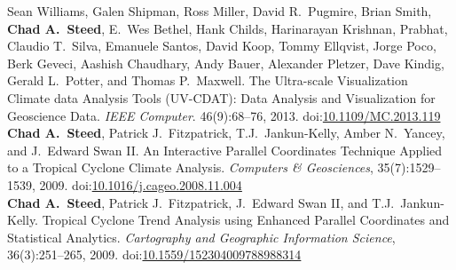 \documentclass[11pt, letterpaper]{article}
\newcommand{\amper}{{\fontspec[Scale=.95]{Hoefler Text}\selectfont\itshape\&}}
\newcommand{\years}[1]{\marginnote{\scriptsize #1}}
\begin{document}
\begin{sloppypar}
Sean Williams, Galen Shipman, Ross Miller, David R.\ Pugmire, Brian Smith,
\textbf{Chad A.\ Steed}, E.\ Wes Bethel, Hank Childs, Harinarayan Krishnan,
Prabhat, Claudio T.\ Silva, Emanuele Santos, David Koop, Tommy Ellqvist,
Jorge Poco, Berk Geveci, Aashish Chaudhary, Andy Bauer, Alexander Pletzer,
Dave Kindig, Gerald L.\ Potter, and Thomas P.\ Maxwell. The Ultra-scale
Visualization Climate data Analysis Tools (UV-CDAT): Data Analysis and
Visualization for Geoscience Data. \emph{IEEE Computer}. 46(9):68--76, 2013.
doi:\href{http://dx.doi.org/10.1109/MC.2013.119}{10.1109/MC.2013.119}\\
\years{2009}\textbf{Chad A.\ Steed}, Patrick J.\ Fitzpatrick, T.J.\ Jankun-Kelly,
Amber N.\ Yancey, and J.\ Edward Swan II. An Interactive
Parallel Coordinates Technique Applied to a Tropical Cyclone Climate
Analysis. \emph{Computers \amper{} Geosciences}, 35(7):1529--1539, 2009.
doi:\href{http://dx.doi.org/10.1016/j.cageo.2008.11.004}
{10.1016/j.cageo.2008.11.004}\\
\years{2009}\textbf{Chad A.\ Steed}, Patrick J.\ Fitzpatrick, J.\ Edward Swan
II, and T.J.\ Jankun-Kelly. Tropical Cyclone Trend Analysis using Enhanced
Parallel Coordinates and Statistical Analytics. \emph{Cartography and
Geographic Information Science}, 36(3):251--265, 2009.
doi:\href{http://dx.doi.org/10.1559/152304009788988314}{10.1559/152304009788988314}
\end{sloppypar}
\end{document}
